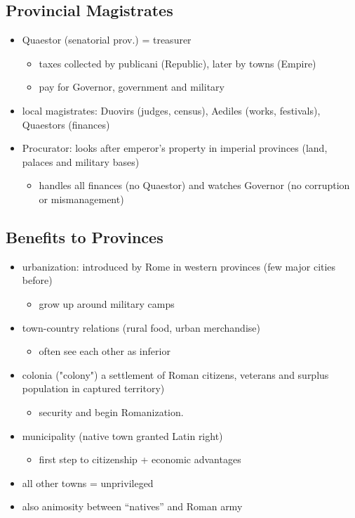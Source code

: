 \documentclass[12pt, twoside]{article}
\begin{document}
\subsection{Provincial Magistrates}
\begin{itemize}
\item Quaestor (senatorial prov.) = treasurer
	\begin{itemize}
	\item taxes collected by publicani (Republic), later by towns (Empire)
	\item pay for Governor, government and military
	\end{itemize}
\item local magistrates: Duovirs (judges, census), Aediles (works, festivals), Quaestors (finances)
\item Procurator: looks after emperor's property in imperial provinces (land, palaces and military bases)
	\begin{itemize}
	\item handles all finances (no Quaestor) and watches Governor (no corruption or mismanagement)
	\end{itemize}
\end{itemize}

\subsection{Benefits to Provinces}
\begin{itemize}
\item urbanization: introduced by Rome in western provinces (few major cities before)
	\begin{itemize}
	\item grow up around military camps
	\end{itemize}
\item town-country relations (rural food, urban merchandise)
	\begin{itemize}
	\item often see each other as inferior
	\end{itemize}
\item colonia ("colony") a settlement of Roman citizens, veterans and surplus population in captured territory)
	\begin{itemize}
	\item security and begin Romanization.
	\end{itemize}
\item municipality (native town granted Latin right)
	\begin{itemize}
	\item first step to citizenship + economic advantages
	\end{itemize}
\item all other towns = unprivileged
\item also animosity between “natives” and Roman army
\end{itemize}
\end{document}
